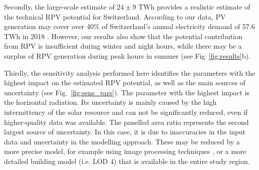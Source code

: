 Secondly, the large-scale estimate of $24 \pm 9$ TWh provides a realistic estimate of the technical RPV potential for Switzerland. According to our data, PV generation may cover over 40\% of Switzerland's annual electricity demand of 57.6 TWh in 2018 \cite{swiss_federal_institue_for_energy_schweizerische_2018}. However, our results also show that the potential contribution from RPV is insufficient during winter and night hours, while there may be a surplus of RPV generation during peak hours in summer (see Fig~\ref{fig:results}b). 

Thirdly, the sensitivity analysis performed here identifies the parameters with the highest impact on the estimated RPV potential, as well as the main sources of uncertainty (see Fig.~\ref{fig:sens_vars}). The parameter with the highest impact is the horizontal radiation. Its uncertainty is mainly caused by the high intermittency of the solar resource and can not be significantly reduced, even if higher-quality data was available. 
The panelled area ratio represents the second largest source of uncertainty. In this case, it is due to inaccuracies in the input data and uncertainty in the modelling approach. These may be reduced by a more precise model, for example using image processing techniques \cite{mainzer_assessment_2017}, or a more detailed building model (i.e. LOD 4) that is available in the entire study region.

